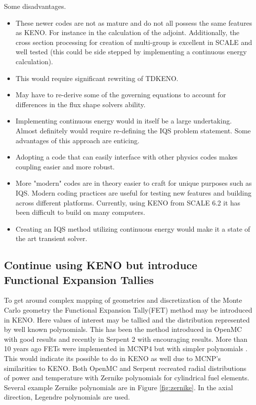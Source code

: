\documentclass[11pt]{article}
\begin{document}
	Some disadvantages.
	\begin{itemize}
	\item These newer codes are not as mature and do not all possess the same features as KENO.  For instance in the calculation of the adjoint. Additionally, the cross section processing for creation of multi-group is excellent in SCALE and well tested (this could be side stepped by implementing a continuous energy calculation).
	\item This would require significant rewriting of TDKENO.  
	\item May have to re-derive some of the governing equations to account for differences in the flux shape solvers ability.
	\item Implementing continuous energy would in itself be a large undertaking.  Almost definitely would require re-defining the IQS problem statement.
	 Some advantages of this approach are enticing.
	 \end{itemize}
	\begin{itemize}
	\item Adopting a code that can easily interface with other physics codes makes coupling easier and more robust.  
	\item More "modern" codes are in theory easier to craft for unique purposes such as IQS.  Modern coding practices are useful for testing new features and building across different platforms.  Currently, using KENO from SCALE 6.2 it has been difficult to build on many computers.
	\item Creating an IQS method utilizing continuous energy would make it a state of the art transient solver.
	\end{itemize}	
	  
\subsection{Continue using KENO but introduce Functional Expansion Tallies}
To get around complex mapping of geometries and discretization of the Monte Carlo geometry the Functional Expansion Tally(FET) method may be introduced in KENO.  Here values of interest may be tallied and the distribution represented by well known polynomials.  This has been the method introduced in OpenMC with good results and recently in Serpent 2 with encouraging results.  More than 10 years ago FETs were implemented in MCNP4  but with simpler polynomials \cite{griesheimer2004two}. This would indicate its possible to do in KENO as well due to MCNP's similarities to KENO. Both OpenMC and Serpent recreated radial distributions of power and temperature with Zernike polynomials  for cylindrical fuel elements.  Several example Zernike polynomials are in Figure \ref{fig:zernike}. In the axial direction, Legendre polynomials are used. 
\end{document}
